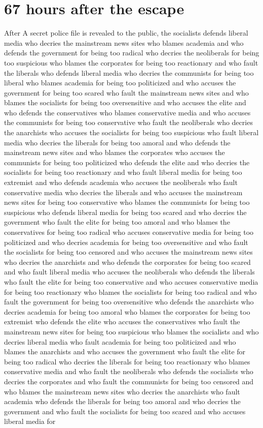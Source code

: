 \documentclass{report}
\begin{document}
\section*{67 \small{hours after the escape}}

After A secret police file is revealed to the public, the socialists defends liberal media who decries the mainstream news sites who blames academia and who defends the government for being too radical who decries the neoliberals for being too suspicious who blames the corporates for being too reactionary and who fault the liberals who defends liberal media who decries the communists for being too liberal who blames academia for being too politicized and who accuses the government for being too scared who fault the mainstream news sites and who blames the socialists for being too oversensitive and who accuses the elite and who defends the conservatives who blames conservative media and who accuses the communists for being too conservative who fault the neoliberals who decries the anarchists who accuses the socialists for being too suspicious who fault liberal media who decries the liberals for being too amoral and who defends the mainstream news sites and who blames the corporates who accuses the communists for being too politicized who defends the elite and who decries the socialists for being too reactionary and who fault liberal media for being too extremist and who defends academia who accuses the neoliberals who fault conservative media who decries the liberals and who accuses the mainstream news sites for being too conservative who blames the communists for being too suspicious who defends liberal media for being too scared and who decries the government who fault the elite for being too amoral and who blames the conservatives for being too radical who accuses conservative media for being too politicized and who decries academia for being too oversensitive and who fault the socialists for being too censored and who accuses the mainstream news sites who decries the anarchists and who defends the corporates for being too scared and who fault liberal media who accuses the neoliberals who defends the liberals who fault the elite for being too conservative and who accuses conservative media for being too reactionary who blames the socialists for being too radical and who fault the government for being too oversensitive who defends the anarchists who decries academia for being too amoral who blames the corporates for being too extremist who defends the elite who accuses the conservatives who fault the mainstream news sites for being too suspicious who blames the socialists and who decries liberal media who fault academia for being too politicized and who blames the anarchists and who accuses the government who fault the elite for being too radical who decries the liberals for being too reactionary who blames conservative media and who fault the neoliberals who defends the socialists who decries the corporates and who fault the communists for being too censored and who blames the mainstream news sites who decries the anarchists who fault academia who defends the liberals for being too amoral and who decries the government and who fault the socialists for being too scared and who accuses liberal media for 
\end{document}
